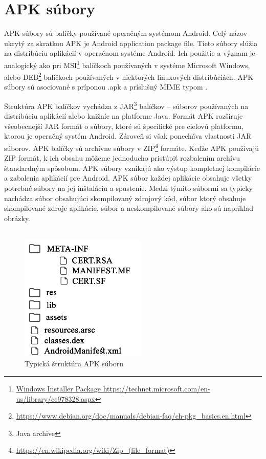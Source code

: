 \chapter{APK súbory}
APK súbory sú balíčky používané operačným systémom Android. Celý názov ukrytý za skratkou APK je Android application package file. Tieto súbory slúžia na distribúciu aplikácií v operačnom systéme Android. Ich použitie a význam je analogický ako pri MSI\footnote{\url{Windows Installer Package https://technet.microsoft.com/en-us/library/cc978328.aspx}} balíčkoch používaných v systéme Microsoft Windows, alebo DEB\footnote{\url{https://www.debian.org/doc/manuals/debian-faq/ch-pkg\_basics.en.html}} balíčkoch používaných v niektorých linuxových distribúciách. APK súbory sú asociované s príponou .apk a príslušný MIME typom .

Štruktúra APK balíčkov vychádza z JAR\footnote{Java archive} balíčkov -- súborov používaných na distribúciu aplikácií alebo knižníc na platforme Java. Formát APK rozširuje všeobecnejší JAR formát o súbory, ktoré sú špecifické pre cieľovú platformu, ktorou je operačný systém Android. Zároveň si však ponecháva vlastnosti JAR súborov. APK balíčky sú archívne súbory v ZIP\footnote{\url{https://en.wikipedia.org/wiki/Zip\_(file_format)}} formáte.  Keďže APK používajú ZIP formát, k ich obsahu môžeme jednoducho pristúpiť rozbalením archívu štandardným spôsobom.  APK súbory vznikajú ako výstup kompletnej kompilácie a zabalenia aplikácií pre Android. APK súbor každej aplikácie obsahuje všetky potrebné súbory na jej inštaláciu a spustenie. Medzi týmito súbormi sa typicky nachádza  súbor obsahujúci skompilovaný zdrojový kód,  súbor ktorý obsahuje skompilované zdroje aplikácie, súbor  a neskompilované súbory ako sú napríklad obrázky.\\\\
\begin{figure}[htb]
  \begin{center}
    \includegraphics[width=60mm]{images/apkStructure.pdf}
  \end{center}
  \caption{Typická štruktúra APK súboru}
\end{figure}

